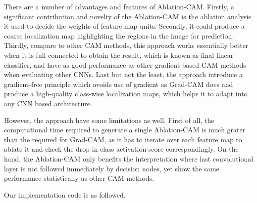 \documentclass[conference]{IEEEtran}
\begin{document}
	There are a number of advantages and features of Ablation-CAM. Firstly, a significant contribution and novelty of the Ablation-CAM is the ablation analysis it used to decide the weights of feature map units. Secondly, it could produce a coarse localization map highlighting the regions in the image for prediction. Thirdly, compare to other CAM methods, this approach works essentially better when it is full connected to obtain the result, which is known as final linear classifier, and have as good performance as other gradient-based CAM methods when evaluating other CNNs. Last but not the least, the approach introduce a gradient-free principle which avoids use of gradient as Grad-CAM does and produce a high-quality class-wise localization maps, which helps it to adapt into any CNN based architecture.\par
	However, the approach have some limitations as well. First of all, the computational time required to generate a single Ablation-CAM is much grater than the required for Grad-CAM, as it has to iterate over each feature map to ablate it and check the drop in class activation score correspondingly. 
	On the hand, the Ablation-CAM only benefits the interpretation where last convolutional layer is not followed immediately by decision nodes, yet show the same performance statistically as other CAM methods.\par
	
	Our implementation code is as followed.
	
\end{document}
